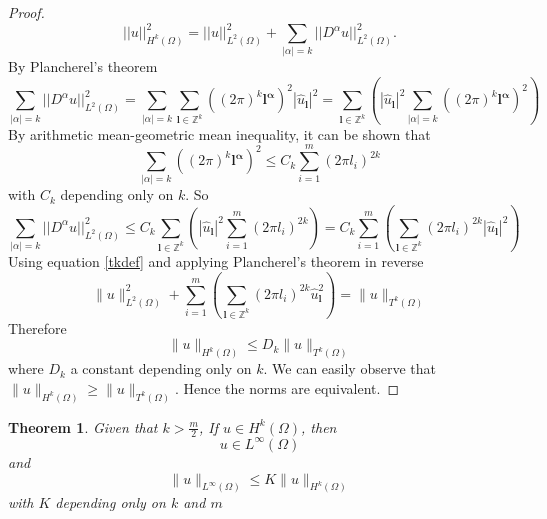 \documentclass[multixcb]{amstext-l}
\theoremstyle{plain}
\newtheorem{theorem}{Theorem}[chapter]
\theoremstyle{definition}
\theoremstyle{definition}
\theoremstyle{remark}
\numberwithin{equation}{chapter}
\begin{document}
\begin{appendix}
\begin{proof}
\begin{equation}
    ||u||_{H^k(\Omega)}^2 = ||u||_{L^2(\Omega)}^2 + \sum_{|\alpha| =  k} ||D^{\alpha} u||_{L^2(\Omega)}^2.
\end{equation}
By Plancherel's theorem
\begin{equation}
\sum_{|\alpha| =  k} ||D^{\alpha} u||_{L^2(\Omega)}^2 =   \sum_{|\alpha| =  k} \sum_{\boldsymbol{l} \in \mathbb{Z}^k} ((2\pi)^k \boldsymbol{l^{\alpha}})^{2} |\hat{u}_{\boldsymbol{l}}|^2
=
 \sum_{\boldsymbol{l} \in \mathbb{Z}^k}( |\hat{u}_{\boldsymbol{l}}|^2 \sum_{|\alpha| =  k} ((2\pi)^k \boldsymbol{l^{\alpha}})^{2} )   
\end{equation}
By arithmetic mean-geometric mean inequality, it can be shown that 
\begin{equation}
    \sum_{|\alpha| =  k} ((2\pi)^k \boldsymbol{l^{\alpha}})^{2} \le C_k \sum_{i =  1}^m (2\pi l_i)^{2k}
\end{equation}
with $C_k$ depending only on $k$.
So 
\begin{equation}
    \sum_{|\alpha| =  k} ||D^{\alpha} u||_{L^2(\Omega)}^2 \le C_k \sum_{\boldsymbol{l} \in \mathbb{Z}^k}( |\hat{u}_{\boldsymbol{l}}|^2 \sum_{i = 1}^m (2\pi l_i)^{2k} ) = C_k \sum_{i = 1}^m( \sum_{\boldsymbol{l} \in \mathbb{Z}^k}(2\pi l_i)^{2k}|\hat{u}_{\boldsymbol{l}}|^2 ) 
\end{equation}
Using equation \ref{tkdef} and applying Plancherel's theorem in reverse
\begin{equation}
    \|u\|_{L^2(\Omega)}^2 + \sum_{i = 1}^m( \sum_{\boldsymbol{l} \in \mathbb{Z}^k}(2\pi l_i)^{2k}\hat{u}_{\boldsymbol{l}}^2 ) = \|u\|_{T^k(\Omega)}
\end{equation}
Therefore
\begin{equation}
\|u\|_{H^k(\Omega)} \le D_k \|u\|_{T^k(\Omega)}    
\end{equation}
where $D_k$ a constant depending only on $k$.
We can easily observe that $\|u\|_{H^k(\Omega)} \ge \|u\|_{T^k(\Omega)} $. Hence the norms are equivalent.
\end{proof}

\begin{theorem}
\label{th_uconv}
Given that $k>\frac{m}{2}$, If $u \in H^k(\Omega)$, then
\begin{equation}
u\in L^{\infty}(\Omega)
\end{equation}
and 
\begin{equation}
\|u\|_{L^{\infty}(\Omega)} \le K\|u\|_{H^k(\Omega)}
\end{equation}
with $K$  depending only on $k$ and $m$
\end{theorem}


\end{appendix}
\end{document}
